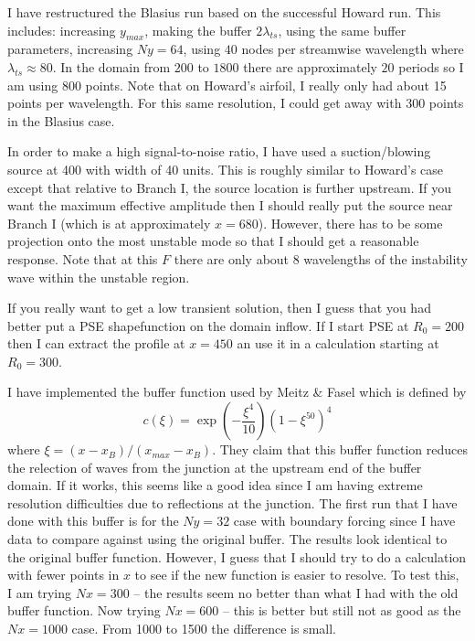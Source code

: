\documentclass[12pt]{article}
\begin{document}
I have restructured the Blasius run based on the successful Howard run.  This
includes: increasing $y_{max}$, making the buffer $2 \lambda_{ts}$, using the
same buffer parameters, increasing $Ny=64$, using $40$ nodes per streamwise
wavelength where $\lambda_{ts} \approx 80$.  In the domain from $200$ to
$1800$ there are approximately $20$ periods so I am using 800 points.  Note
that on Howard's airfoil, I really only had about 15 points per wavelength.
For this same resolution, I could get away with 300 points in the Blasius
case.

In order to make a high signal-to-noise ratio, I have used a suction/blowing
source at 400 with width of 40 units.  This is roughly similar to Howard's
case except that relative to Branch I, the source location is further
upstream.  If you want the maximum effective amplitude then I should really
put the source near Branch I (which is at approximately $x=680$).  However,
there has to be some projection onto the most unstable mode so that I should
get a reasonable response.  Note that at this $F$ there are only about 8
wavelengths of the instability wave within the unstable region.

If you really want to get a low transient solution, then I guess that you had
better put a PSE shapefunction on the domain inflow.  If I start PSE at
$R_0=200$ then I can extract the profile at $x=450$ an use it in a calculation
starting at $R_0=300$.

I have implemented the buffer function used by Meitz \& Fasel which is defined
by
%
\begin{equation}
  c(\xi) = \exp\left(-\frac{\xi^4}{10}\right)\left( 1 - \xi^50 \right)^4
\end{equation}
%
where $\xi = (x-x_B)/(x_{max}-x_B)$.  They claim that this buffer function
reduces the relection of waves from the junction at the upstream end of the
buffer domain.  If it works, this seems like a good idea since I am having
extreme resolution difficulties due to reflections at the junction.  The first
run that I have done with this buffer is for the $Ny=32$ case with boundary
forcing since I have data to compare against using the original buffer.  The
results look identical to the original buffer function.  However, I guess that
I should try to do a calculation with fewer points in $x$ to see if the new
function is easier to resolve.  To test this, I am trying $Nx=300$ -- the
results seem no better than what I had with the old buffer function.  Now
trying $Nx=600$ -- this is better but still not as good as the $Nx=1000$
case. From 1000 to 1500 the difference is small.
\end{document}
